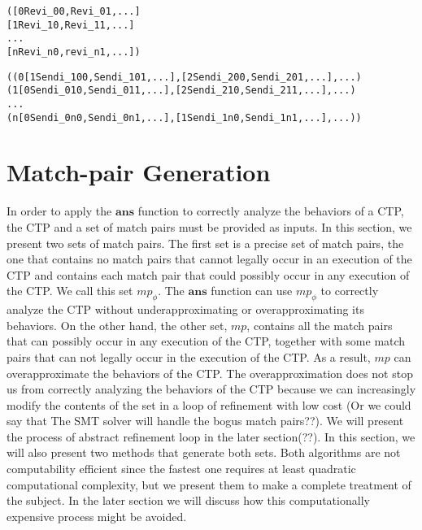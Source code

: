

\newsavebox{\boxReviList}
\begin{lrbox}{\boxReviList}
\begin{minipage}[c]{0.4\linewidth}
\begin{alltt}
([0 Revi_00, Revi_01, ...]
 [1 Revi_10, Revi_11, ...]
 ...
 [n Revi_n0, revi_n1, ...])
\end{alltt}
\end{minipage}
\end{lrbox}

\newsavebox{\boxSendiList}
\begin{lrbox}{\boxSendiList}
\begin{minipage}[c]{0.4\linewidth}
\begin{alltt}
((0 [1 Sendi_100, Sendi_101, ...], [2 Sendi_200, Sendi_201, ...], ...)
 (1 [0 Sendi_010, Sendi_011, ...], [2 Sendi_210, Sendi_211, ...], ...)
 ...
 (n [0 Sendi_0n0, Sendi_0n1, ...], [1 Sendi_1n0, Sendi_1n1, ...], ...))

\end{alltt}
\end{minipage}
\end{lrbox}

\section{ Match-pair Generation}

In order to apply the $\mathbf{ans}$ function to correctly analyze the behaviors of a CTP, the CTP and a set of match pairs must be provided as inputs. In this section, we present two sets of match pairs. The first set is a precise set of match pairs, the one that contains no match pairs that cannot legally occur in an execution of the CTP and contains each match pair that could possibly occur in any execution of the CTP. We call this set $mp_{\phi}$. The $\mathbf{ans}$ function can use $mp_{\phi}$ to correctly analyze the CTP without underapproximating or overapproximating its behaviors. On the other hand, the other set, $mp$, contains all the match pairs that can possibly occur in any execution of the CTP, together with some match pairs that can not legally occur in the execution of the CTP. As a result, $mp$ can overapproximate the behaviors of the CTP. The overapproximation does not stop us from correctly analyzing the behaviors of the CTP because we can increasingly modify the contents of the set in a loop of refinement with low cost (Or we could say that The SMT solver will handle the bogus match pairs??). We will present the process of abstract refinement loop in the later section(??). In this section, we will also present two methods that generate both sets. Both algorithms are not computability efficient since the fastest one requires at least quadratic computational complexity, but we present them to make a complete treatment of the subject. In the later section we will discuss how this computationally expensive process might be avoided.

